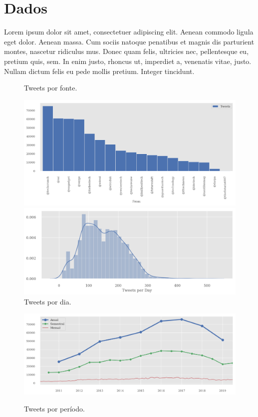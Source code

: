 \documentclass[paper=a4, fontsize=11pt]{scrartcl}
\numberwithin{equation}{section}		%
\numberwithin{figure}{section}			%
\numberwithin{table}{section}				%
\begin{document}
\section{Dados}\label{sec:dados}
Lorem ipsum dolor sit amet, consectetuer adipiscing elit. Aenean commodo ligula eget dolor. Aenean massa. Cum sociis natoque penatibus et magnis dis parturient montes, nascetur ridiculus mus. Donec quam felis, ultricies nec, pellentesque eu, pretium quis, sem. In enim justo, rhoncus ut, imperdiet a, venenatis vitae, justo. Nullam dictum felis eu pede mollis pretium. Integer tincidunt. 
\begin{figure}[!h]
  \centering
  \begin{minipage}[t]{0.4\textwidth}
		\caption{Tweets por fonte.}
    \includegraphics[width=\textwidth]{from}
  \end{minipage}
  \hfill
  \begin{minipage}[t]{0.4\textwidth}
		\caption{Tweets por dia.}
    \includegraphics[width=\textwidth]{perDay}
  \end{minipage}
\end{figure}
\begin{figure}[h]
	\centering
	\caption{Tweets por período.}
	\includegraphics[width=.8\columnwidth]{anual-semestral}
	\label{fig:volume-tweets}
\end{figure}
\end{document}
